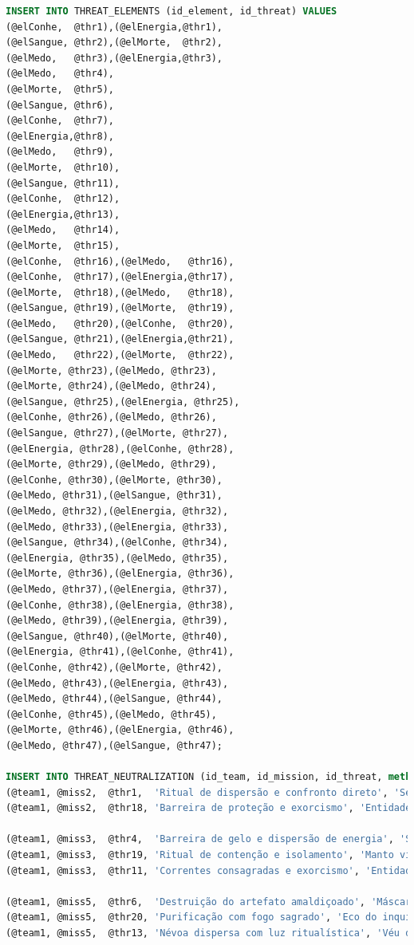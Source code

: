 \documentclass[12pt,a4paper]{report}
\begin{document}
\begin{lstlisting}[language=SQL, caption=population.sql]
INSERT INTO THREAT_ELEMENTS (id_element, id_threat) VALUES
(@elConhe,  @thr1),(@elEnergia,@thr1),
(@elSangue, @thr2),(@elMorte,  @thr2),
(@elMedo,   @thr3),(@elEnergia,@thr3),
(@elMedo,   @thr4),
(@elMorte,  @thr5),
(@elSangue, @thr6),
(@elConhe,  @thr7),
(@elEnergia,@thr8),
(@elMedo,   @thr9),
(@elMorte,  @thr10),
(@elSangue, @thr11),
(@elConhe,  @thr12),
(@elEnergia,@thr13),
(@elMedo,   @thr14),
(@elMorte,  @thr15),
(@elConhe,  @thr16),(@elMedo,   @thr16),
(@elConhe,  @thr17),(@elEnergia,@thr17),
(@elMorte,  @thr18),(@elMedo,   @thr18),
(@elSangue, @thr19),(@elMorte,  @thr19),
(@elMedo,   @thr20),(@elConhe,  @thr20),
(@elSangue, @thr21),(@elEnergia,@thr21),
(@elMedo,   @thr22),(@elMorte,  @thr22),
(@elMorte, @thr23),(@elMedo, @thr23),
(@elMorte, @thr24),(@elMedo, @thr24),
(@elSangue, @thr25),(@elEnergia, @thr25),
(@elConhe, @thr26),(@elMedo, @thr26),
(@elSangue, @thr27),(@elMorte, @thr27),
(@elEnergia, @thr28),(@elConhe, @thr28),
(@elMorte, @thr29),(@elMedo, @thr29),
(@elConhe, @thr30),(@elMorte, @thr30),
(@elMedo, @thr31),(@elSangue, @thr31),
(@elMedo, @thr32),(@elEnergia, @thr32),
(@elMedo, @thr33),(@elEnergia, @thr33),
(@elSangue, @thr34),(@elConhe, @thr34),
(@elEnergia, @thr35),(@elMedo, @thr35),
(@elMorte, @thr36),(@elEnergia, @thr36),
(@elMedo, @thr37),(@elEnergia, @thr37),
(@elConhe, @thr38),(@elEnergia, @thr38),
(@elMedo, @thr39),(@elEnergia, @thr39),
(@elSangue, @thr40),(@elMorte, @thr40),
(@elEnergia, @thr41),(@elConhe, @thr41),
(@elConhe, @thr42),(@elMorte, @thr42),
(@elMedo, @thr43),(@elEnergia, @thr43),
(@elMedo, @thr44),(@elSangue, @thr44),
(@elConhe, @thr45),(@elMedo, @thr45),
(@elMorte, @thr46),(@elEnergia, @thr46),
(@elMedo, @thr47),(@elSangue, @thr47);

INSERT INTO THREAT_NEUTRALIZATION (id_team, id_mission, id_threat, method, result) VALUES
(@team1, @miss2,  @thr1,  'Ritual de dispersão e confronto direto', 'Seita desmantelada e membros capturados'),
(@team1, @miss2,  @thr18, 'Barreira de proteção e exorcismo', 'Entidade banida do local'),

(@team1, @miss3,  @thr4,  'Barreira de gelo e dispersão de energia', 'Ser de gelo ancestral derretido e banido'),
(@team1, @miss3,  @thr19, 'Ritual de contenção e isolamento', 'Manto vivo selado em câmara especial'),
(@team1, @miss3,  @thr11, 'Correntes consagradas e exorcismo', 'Entidade das correntes aprisionada novamente'),

(@team1, @miss5,  @thr6,  'Destruição do artefato amaldiçoado', 'Máscara infernal destruída'),
(@team1, @miss5,  @thr20, 'Purificação com fogo sagrado', 'Eco do inquisidor silenciado'),
(@team1, @miss5,  @thr13, 'Névoa dispersa com luz ritualística', 'Véu de névoa carmesim dissipado'),


\end{lstlisting}
\end{document}

